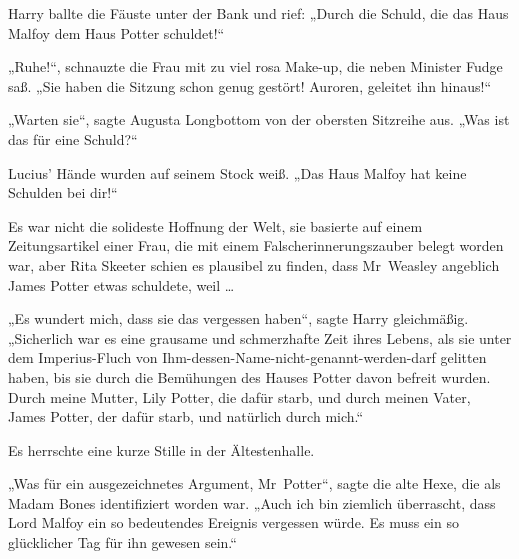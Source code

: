 Harry ballte die Fäuste unter der Bank und rief:
„Durch die Schuld, die das Haus Malfoy dem Haus Potter schuldet!“

„Ruhe!“, schnauzte die Frau mit zu viel rosa Make-up, die neben Minister Fudge saß.
„Sie haben die Sitzung schon genug gestört! Auroren, geleitet ihn hinaus!“

„Warten sie“, sagte Augusta Longbottom von der obersten Sitzreihe aus.
„Was ist das für eine Schuld?“

Lucius’ Hände wurden auf seinem Stock weiß.
„Das Haus Malfoy hat keine Schulden bei dir!“

Es war nicht die solideste Hoffnung der Welt, sie basierte auf einem Zeitungsartikel einer Frau, die mit einem Falscherinnerungszauber belegt worden war, aber Rita Skeeter schien es plausibel zu finden, dass Mr~Weasley angeblich James Potter etwas schuldete, weil …

„Es wundert mich, dass sie das vergessen haben“, sagte Harry gleichmäßig.
„Sicherlich war es eine grausame und schmerzhafte Zeit ihres Lebens, als sie unter dem Imperius-Fluch von Ihm-dessen-Name-nicht-genannt-werden-darf gelitten haben, bis sie durch die Bemühungen des Hauses Potter davon befreit wurden. Durch meine Mutter, Lily Potter, die dafür starb, und durch meinen Vater, James Potter, der dafür starb, und natürlich durch mich.“

Es herrschte eine kurze Stille in der Ältestenhalle.

„Was für ein ausgezeichnetes Argument, Mr~Potter“, sagte die alte Hexe, die als Madam Bones identifiziert worden war.
„Auch ich bin ziemlich überrascht, dass Lord Malfoy ein so bedeutendes Ereignis vergessen würde. Es muss ein so glücklicher Tag für ihn gewesen sein.“

